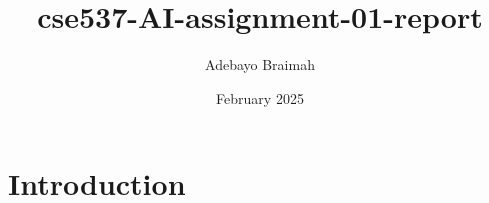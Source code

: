\documentclass{article}
\title{cse537-AI-assignment-01-report}
\author{Adebayo Braimah}
\date{February 2025}
\begin{document}
\maketitle

\section{Introduction}
\end{document}
